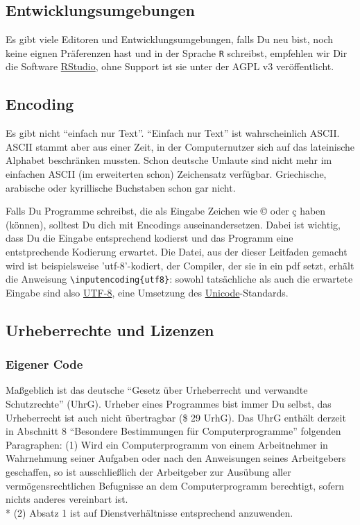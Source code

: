 \documentclass[twoside]{scrartcl}
\providecommand{\R}{\texttt{R}}
\begin{document}
\subsection{Entwicklungsumgebungen}
Es gibt viele Editoren und Entwicklungsumgebungen, falls Du neu bist, noch keine
eignen Pr\"a{}ferenzen hast und in der Sprache \R{} schreibst, empfehlen wir Dir
die Software \href{http://www.rstudio.com/products/rstudio/}{RStudio}, 
ohne Support ist sie unter der AGPL v3 ver\"o{}ffentlicht.

\subsection{Encoding}
Es gibt nicht "`einfach nur Text"'. "`Einfach nur Text"' ist wahrscheinlich
ASCII. ASCII stammt aber aus einer Zeit, in der Computernutzer sich auf das
lateinische Alphabet beschr\"a{}nken mussten. Schon deutsche Umlaute sind nicht
mehr im einfachen ASCII (im erweiterten schon) Zeichensatz verf\"u{}gbar.
Griechische, arabische oder kyrillische Buchstaben schon gar nicht. 


Falls Du Programme schreibst, die als Eingabe Zeichen wie ©  oder ç haben
(k\"o{}nnen), solltest Du dich mit Encodings auseinandersetzen. Dabei ist
wichtig, dass Du die Eingabe entsprechend kodierst und das Programm eine
entstprechende Kodierung erwartet. Die Datei, aus der dieser Leitfaden gemacht
wird ist beispielsweise 'utf-8'-kodiert, der Compiler, der sie in ein pdf setzt,
erh\"a{}lt die Anweisung \verb+\inputencoding{utf8}+: sowohl tats\"a{}chliche
als auch die erwartete Eingabe sind also 
\href{http://en.wikipedia.org/wiki/UTF-8}{UTF-8}, eine Umsetzung des
\href{http://en.wikipedia.org/wiki/Unicode}{Unicode}-Standards.
\subsection{Urheberrechte und Lizenzen}
\subsubsection{Eigener Code}
Ma\ss{}geblich ist das deutsche "`Gesetz \"u{}ber Urheberrecht und verwandte
Schutzrechte"' (UhrG). 
Urheber eines Programmes bist immer Du selbst, das Urheberrecht ist auch nicht
\"u{}bertragbar (\$ 29 UrhG).
Das UhrG enth\"a{}lt derzeit in Abschnitt 8 "`Besondere Bestimmungen
f\"u{}r 
Computerprogramme"' folgenden Paragraphen:
(1) Wird ein Computerprogramm von einem Arbeitnehmer in Wahrnehmung seiner
Aufgaben oder nach den Anweisungen seines Arbeitgebers geschaffen, so ist
ausschlie\ss{}lich der Arbeitgeber zur Aus\"u{}bung aller 
verm\"o{}gensrechtlichen Befugnisse an dem Computerprogramm berechtigt, sofern 
nichts anderes vereinbart ist.\\*
(2) Absatz 1 ist auf Dienstverh\"a{}ltnisse entsprechend anzuwenden.
\end{document}
